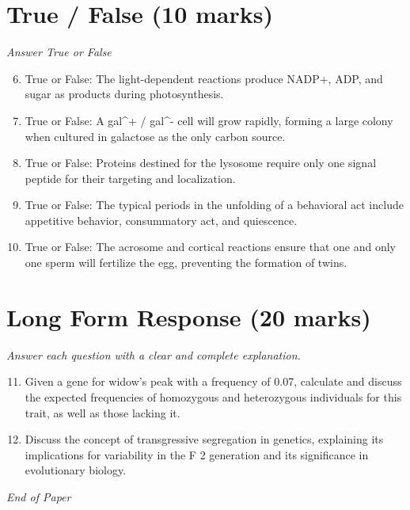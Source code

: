 \documentclass[12pt]{article}
\begin{document}
\section*{True / False (10 marks)}
\textit{Answer True or False}
\begin{enumerate}[label=\arabic*.]
\setcounter{enumi}{5}
\item True or False: The light-dependent reactions produce NADP+, ADP, and sugar as products during photosynthesis.
\item True or False: A gal^+ / gal^- cell will grow rapidly, forming a large colony when cultured in galactose as the only carbon source.
\item True or False: Proteins destined for the lysosome require only one signal peptide for their targeting and localization.
\item True or False: The typical periods in the unfolding of a behavioral act include appetitive behavior, consummatory act, and quiescence.
\item True or False: The acrosome and cortical reactions ensure that one and only one sperm will fertilize the egg, preventing the formation of twins.
\end{enumerate}

\section*{Long Form Response (20 marks)}
\textit{Answer each question with a clear and complete explanation.}
\begin{enumerate}[label=\arabic*.]
\setcounter{enumi}{10}
\item Given a gene for widow's peak with a frequency of 0.07, calculate and discuss the expected frequencies of homozygous and heterozygous individuals for this trait, as well as those lacking it.
\item Discuss the concept of transgressive segregation in genetics, explaining its implications for variability in the F 2 generation and its significance in evolutionary biology.
\end{enumerate}

\vfill
\noindent\textit{End of Paper}
\end{document}
